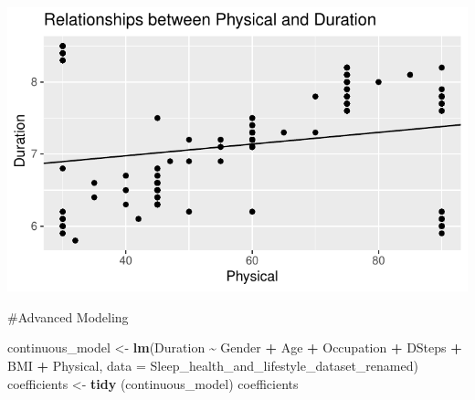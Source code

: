 \documentclass[
  11pt,
]{article}
\newenvironment{Shaded}{\begin{snugshade}}{\end{snugshade}}
\newcommand{\AttributeTok}[1]{\textcolor[rgb]{0.13,0.29,0.53}{#1}}
\newcommand{\FunctionTok}[1]{\textcolor[rgb]{0.13,0.29,0.53}{\textbf{#1}}}
\newcommand{\NormalTok}[1]{#1}
\newcommand{\OtherTok}[1]{\textcolor[rgb]{0.56,0.35,0.01}{#1}}
\newcommand{\SpecialCharTok}[1]{\textcolor[rgb]{0.81,0.36,0.00}{\textbf{#1}}}
\begin{document}
\begin{center}\includegraphics[width=0.7\linewidth]{SleepHelath_files/figure-latex/unnamed-chunk-53-1} \end{center}

\#Advanced Modeling

\begin{Shaded}
\begin{Highlighting}[]
\NormalTok{continuous\_model }\OtherTok{\textless{}{-}} \FunctionTok{lm}\NormalTok{(Duration }\SpecialCharTok{\textasciitilde{}}\NormalTok{ Gender }\SpecialCharTok{+}\NormalTok{ Age }\SpecialCharTok{+}\NormalTok{ Occupation }\SpecialCharTok{+}\NormalTok{ DSteps }\SpecialCharTok{+}\NormalTok{ BMI }\SpecialCharTok{+}\NormalTok{ Physical, }\AttributeTok{data =}\NormalTok{ Sleep\_health\_and\_lifestyle\_dataset\_renamed)}
\NormalTok{coefficients }\OtherTok{\textless{}{-}} \FunctionTok{tidy}\NormalTok{ (continuous\_model)}
\NormalTok{coefficients}
\end{Highlighting}
\end{Shaded}
\end{document}
